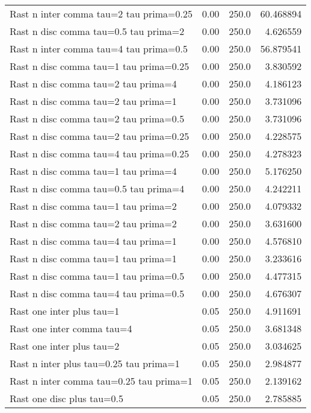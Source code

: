 \documentclass[11pt]{article}
\begin{document}
\begin{tabular}{lrrr}
Rast n inter comma tau=2 tau prima=0.25    &  0.00 &  250.0 &  60.468894 \\
Rast n disc  comma tau=0.5 tau prima=2     &  0.00 &  250.0 &   4.626559 \\
Rast n inter comma tau=4 tau prima=0.5     &  0.00 &  250.0 &  56.879541 \\
Rast n disc  comma tau=1 tau prima=0.25    &  0.00 &  250.0 &   3.830592 \\
Rast n disc  comma tau=2 tau prima=4       &  0.00 &  250.0 &   4.186123 \\
Rast n disc  comma tau=2 tau prima=1       &  0.00 &  250.0 &   3.731096 \\
Rast n disc  comma tau=2 tau prima=0.5     &  0.00 &  250.0 &   3.731096 \\
Rast n disc  comma tau=2 tau prima=0.25    &  0.00 &  250.0 &   4.228575 \\
Rast n disc  comma tau=4 tau prima=0.25    &  0.00 &  250.0 &   4.278323 \\
Rast n disc  comma tau=1 tau prima=4       &  0.00 &  250.0 &   5.176250 \\
Rast n disc  comma tau=0.5 tau prima=4     &  0.00 &  250.0 &   4.242211 \\
Rast n disc  comma tau=1 tau prima=2       &  0.00 &  250.0 &   4.079332 \\
Rast n disc  comma tau=2 tau prima=2       &  0.00 &  250.0 &   3.631600 \\
Rast n disc  comma tau=4 tau prima=1       &  0.00 &  250.0 &   4.576810 \\
Rast n disc  comma tau=1 tau prima=1       &  0.00 &  250.0 &   3.233616 \\
Rast n disc  comma tau=1 tau prima=0.5     &  0.00 &  250.0 &   4.477315 \\
Rast n disc  comma tau=4 tau prima=0.5     &  0.00 &  250.0 &   4.676307 \\
Rast one inter plus  tau=1                 &  0.05 &  250.0 &   4.911691 \\
Rast one inter comma tau=4                 &  0.05 &  250.0 &   3.681348 \\
Rast one inter plus  tau=2                 &  0.05 &  250.0 &   3.034625 \\
Rast n inter plus  tau=0.25 tau prima=1    &  0.05 &  250.0 &   2.984877 \\
Rast n inter comma tau=0.25 tau prima=1    &  0.05 &  250.0 &   2.139162 \\
Rast one disc  plus  tau=0.5               &  0.05 &  250.0 &   2.785885 \\

\end{tabular}
\end{document}
